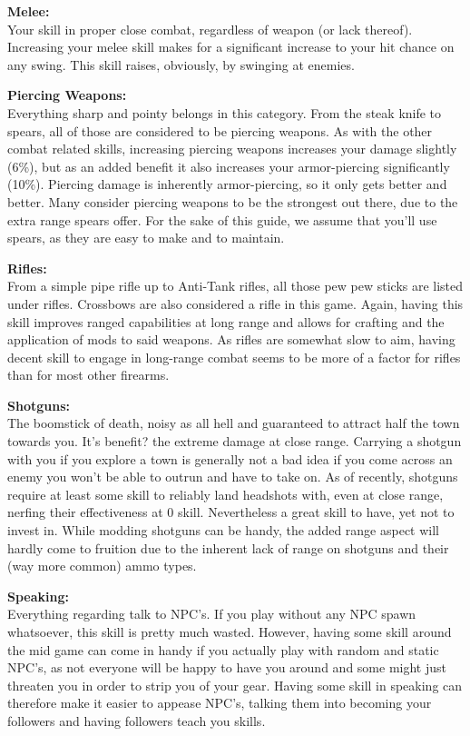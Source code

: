 \textbf{Melee:}\\Your skill in proper close combat, regardless of weapon (or lack thereof). Increasing your melee skill makes for a significant increase to your hit chance on any swing. This skill raises, obviously, by swinging at enemies.

\textbf{Piercing Weapons:}\\Everything sharp and pointy belongs in this category. From the steak knife to spears, all of those are considered to be piercing weapons. As with the other combat related skills, increasing piercing weapons increases your damage slightly (6\%), but as an added benefit it also increases your armor-piercing significantly (10\%). Piercing damage is inherently armor-piercing, so it only gets better and better. Many consider piercing weapons to be the strongest out there, due to the extra range spears offer. For the sake of this guide, we assume that you'll use spears, as they are easy to make and to maintain.

\textbf{Rifles:}\\From a simple pipe rifle up to Anti-Tank rifles, all those pew pew sticks are listed under rifles. Crossbows are also considered a rifle in this game. Again, having this skill improves ranged capabilities at long range and allows for crafting and the application of mods to said weapons. As rifles are somewhat slow to aim, having decent skill to engage in long-range combat seems to be more of a factor for rifles than for most other firearms.

\textbf{Shotguns:}\\The boomstick of death, noisy as all hell and guaranteed to attract half the town towards you. It's benefit? the extreme damage at close range. Carrying a shotgun with you if you explore a town is generally not a bad idea if you come across an enemy you won't be able to outrun and have to take on. As of recently, shotguns require at least some skill to reliably land headshots with, even at close range, nerfing their effectiveness at 0 skill. Nevertheless a great skill to have, yet not to invest in. While modding shotguns can be handy, the added range aspect will hardly come to fruition due to the inherent lack of range on shotguns and their (way more common) ammo types.

\textbf{Speaking:}\\Everything regarding talk to NPC's. If you play without any NPC spawn whatsoever, this skill is pretty much wasted. However, having some skill around the mid game can come in handy if you actually play with random and static NPC's, as not everyone will be happy to have you around and some might just threaten you in order to strip you of your gear. Having some skill in speaking can therefore make it easier to appease NPC's, talking them into becoming your followers and having followers teach you skills.

